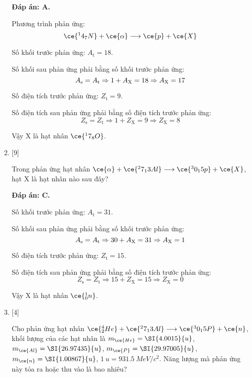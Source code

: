 \begin{enumerate}[label=\bfseries Câu \arabic*:]
	\loigiai
	{		\textbf{Đáp án: A.}
		
		Phương trình phản ứng:
		$$\ce{^14_7 N} + \ce{\alpha} \longrightarrow \ce{p} + \ce{X}$$
		
		Số khối trước phản ứng: $A_\text{t} = 18$.
		
		Số khối sau phản ứng phải bằng số khối trước phản ứng:
		$$A_\text{s} = A_\text{t} \Rightarrow 1+A_\text X = 18 \Rightarrow A_\text X = 17$$
		
		Số điện tích trước phản ứng: $Z_\text{t} = 9$.
		
		Số điện tích sau phản ứng phải bằng số điện tích trước phản ứng:
		$$Z_\text{s} = Z_\text{t} \Rightarrow 1 + Z_\text{X} = 9 \Rightarrow Z_\text{X} = 8$$
		
		Vậy X là hạt nhân $\ce{^17_8 O}$.
		
	}
	\item {} [9]
	\cauhoi
	{Trong phản ứng hạt nhân $\ce{\alpha} + \ce{^27_13 Al} \longrightarrow \ce{^30_15 p} + \ce{X}$, hạt X là hạt nhân nào sau đây?
	}
	
	\loigiai
	{		\textbf{Đáp án: C.}
		
		Số khối trước phản ứng: $A_\text{t} = 31$.
		
		Số khối sau phản ứng phải bằng số khối trước phản ứng:
		$$A_\text{s} = A_\text{t} \Rightarrow 30+A_\text X = 31 \Rightarrow A_\text X = 1$$
		
		Số điện tích trước phản ứng: $Z_\text{t} = 15$.
		
		Số điện tích sau phản ứng phải bằng số điện tích trước phản ứng:
		$$Z_\text{s} = Z_\text{t} \Rightarrow 15 + Z_\text{X} = 15 \Rightarrow Z_\text{X} = 0$$
		
		Vậy X là hạt nhân $\ce{^1_0 n}$.
		
	}
	\item {} [4]
	\cauhoi
	{Cho phản ứng hạt nhân $\ce{^4_2 He} + \ce{^27_13 Al} \longrightarrow \ce{^30_15 P} + \ce{n}$, khối lượng của các hạt nhân là $m_{\ce{He}} = \SI{4.0015}{u}$, $m_{\ce{Al}} = \SI{26.97435}{u}$, $m_{\ce{P}} = \SI{29.97005}{u}$, $m_{\ce{n}} = \SI{1.00867}{u}$, $\SI{1}{u} = \SI{931.5}{MeV/c^2}$. Năng lượng mà phản ứng này tỏa ra hoặc thu vào là bao nhiêu?
	}
	

\end{enumerate}
